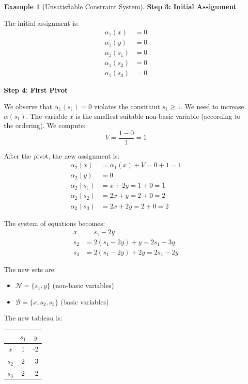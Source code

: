 \documentclass[11pt,a4paper]{article}
\theoremstyle{definition}
\newtheorem{example}{Example}[section]
\theoremstyle{plain}
\theoremstyle{remark}
\begin{document}
\begin{example}[Unsatisfiable Constraint System]
    \textbf{Step 3: Initial Assignment}
    
    The initial assignment is:
    \begin{align*}
        \alpha_1(x) &= 0 \\
        \alpha_1(y) &= 0 \\
        \alpha_1(s_1) &= 0 \\
        \alpha_1(s_2) &= 0 \\
        \alpha_1(s_3) &= 0
    \end{align*}
    
    \textbf{Step 4: First Pivot}
    
    We observe that $\alpha_1(s_1) = 0$ violates the constraint $s_1 \geq 1$. We need to increase $\alpha(s_1)$. The variable $x$ is the smallest suitable non-basic variable (according to the ordering). We compute:
    \[
        V = \frac{1 - 0}{1} = 1
    \]
    
    After the pivot, the new assignment is:
    \begin{align*}
        \alpha_2(x) &= \alpha_1(x) + V = 0 + 1 = 1 \\
        \alpha_2(y) &= 0 \\
        \alpha_2(s_1) &= x + 2y = 1 + 0 = 1 \\
        \alpha_2(s_2) &= 2x + y = 2 + 0 = 2 \\
        \alpha_2(s_3) &= 2x + 2y = 2 + 0 = 2
    \end{align*}
    
    The system of equations becomes:
    \begin{align*}
        x &= s_1 - 2y \\
        s_2 &= 2(s_1 - 2y) + y = 2s_1 - 3y \\
        s_3 &= 2(s_1 - 2y) + 2y = 2s_1 - 2y
    \end{align*}
    
    The new sets are:
    \begin{itemize}
        \item $\mathcal{N} = \{s_1, y\}$ (non-basic variables)
        \item $\mathcal{B} = \{x, s_2, s_3\}$ (basic variables)
    \end{itemize}
    
    The new tableau is:
    
    \begin{center}
    \begin{tabular}{c|cc}
        & $s_1$ & $y$ \\
        \hline
        $x$ & 1 & -2 \\
        $s_2$ & 2 & -3 \\
        $s_3$ & 2 & -2
    \end{tabular}
    \end{center}
    

\end{example}
\end{document}
